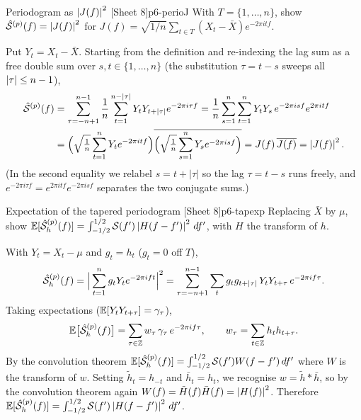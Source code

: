 \begin{exercise}{Periodogram as $\left\lvert J(f) \right\rvert^2$ \quad\textnormal{[Sheet 8]}}{p6-perioJ}
With $T=\{1,\dots,n\}$, show $\hat{\mathcal{S}}^{(p)}(f)=\left\lvert J(f) \right\rvert^2$ for
$J(f)=\sqrt{1/n}\sum_{t\in T}(X_t-\bar X)e^{-2\pi i t f}$.
\end{exercise}
\begin{solution}
Put $Y_t=X_t-\bar X$. Starting from the definition and re-indexing the lag sum
as a free double sum over $s,t\in\{1,\dots,n\}$ (the substitution $\tau=t-s$
sweeps all $\left\lvert \tau \right\rvert\le n-1$),
\[
\begin{aligned}
\hat{\mathcal{S}}^{(p)}(f)
&=\sum_{\tau=-n+1}^{n-1}\frac1n\sum_{t=1}^{n-\left\lvert \tau \right\rvert} Y_tY_{t+\left\lvert \tau \right\rvert}e^{-2\pi i\tau f}
 =\frac1n\sum_{s=1}^{n}\sum_{t=1}^{n} Y_tY_s\,e^{-2\pi i s f}e^{2\pi i t f}\\
&=\Big(\sqrt{\tfrac1n}\sum_{t=1}^{n} Y_t e^{-2\pi i t f}\Big)
  \overline{\Big(\sqrt{\tfrac1n}\sum_{s=1}^{n} Y_s e^{-2\pi i s f}\Big)}
 =J(f)\,\overline{J(f)}=\left\lvert J(f) \right\rvert^2 .
\end{aligned}
\]
(In the second equality we relabel $s=t+|\tau|$ so the lag $\tau=t-s$ runs
freely, and $e^{-2\pi i\tau f}=e^{2\pi i t f}e^{-2\pi i s f}$ separates the two
conjugate sums.)
\end{solution}

\begin{exercise}{Expectation of the tapered periodogram \quad\textnormal{[Sheet 8]}}{p6-tapexp}
Replacing $\bar X$ by $\mu$, show
$\mathbb{E}[\hat{\mathcal{S}}^{(p)}_h(f)]=\int_{-1/2}^{1/2}\mathcal{S}(f')\left\lvert H(f-f') \right\rvert^2\,df'$, with
$H$ the transform of $h$.
\end{exercise}
\begin{solution}
With $Y_t=X_t-\mu$ and $g_t=h_t$ ($g_t=0$ off $T$),
\[
\hat{\mathcal{S}}^{(p)}_h(f)=\Big|\sum_{t=1}^{n} g_t Y_t e^{-2\pi i f t}\Big|^2
=\sum_{\tau=-n+1}^{n-1}\sum_{t} g_t g_{t+\left\lvert \tau \right\rvert}\,Y_t Y_{t+\tau}\,e^{-2\pi i f\tau}.
\]
Taking expectations ($\mathbb{E}[Y_tY_{t+\tau}]=\gamma_\tau$),
\[
\mathbb{E}\big[\hat{\mathcal{S}}^{(p)}_h(f)\big]
=\sum_{\tau\in\mathbb{Z}} w_\tau\,\gamma_\tau\,e^{-2\pi i f\tau},
\qquad w_\tau=\sum_{t\in\mathbb{Z}} h_t h_{t+\tau}.
\]
By the convolution theorem $\mathbb{E}[\hat{\mathcal{S}}^{(p)}_h(f)]=\int_{-1/2}^{1/2}
\mathcal{S}(f')W(f-f')\,df'$ where $W$ is the transform of $w$. Setting
$\tilde h_t=h_{-t}$ and $\bar h_t=h_t$, we recognise $w=\tilde h*\bar h$, so by
the convolution theorem again $W(f)=\tilde H(f)\bar H(f)=\left\lvert H(f) \right\rvert^2$.
Therefore
$\mathbb{E}[\hat{\mathcal{S}}^{(p)}_h(f)]=\int_{-1/2}^{1/2}\mathcal{S}(f')\left\lvert H(f-f') \right\rvert^2\,df'$.
\end{solution}

